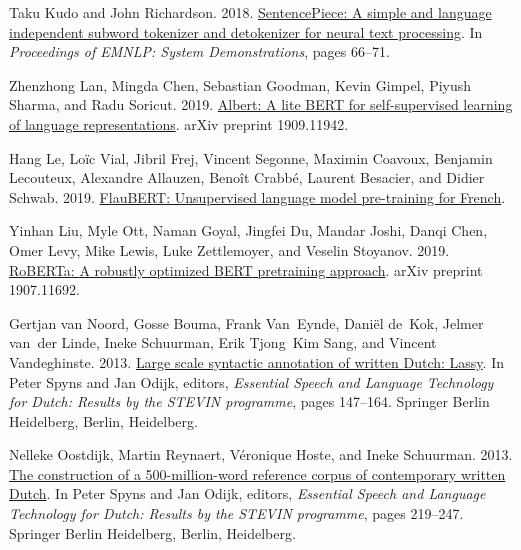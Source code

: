 \documentclass[11pt]{article}
\begin{document}
\begin{thebibliography}{21}
Taku Kudo and John Richardson. 2018.
\newblock \href {https://doi.org/10.18653/v1/D18-2012} {{S}entence{P}iece: A
  simple and language independent subword tokenizer and detokenizer for neural
  text processing}.
\newblock In \emph{Proceedings of EMNLP: System Demonstrations}, pages 66--71.

Zhenzhong Lan, Mingda Chen, Sebastian Goodman, Kevin Gimpel, Piyush Sharma, and
  Radu Soricut. 2019.
\newblock \href {https://arxiv.org/abs/1909.11942} {Albert: A lite {BERT} for
  self-supervised learning of language representations}.
\newblock arXiv preprint 1909.11942.

Hang Le, Loïc Vial, Jibril Frej, Vincent Segonne, Maximin Coavoux, Benjamin
  Lecouteux, Alexandre Allauzen, Benoît Crabbé, Laurent Besacier, and Didier
  Schwab. 2019.
\newblock \href {http://arxiv.org/abs/1912.05372} {{FlauBERT}: Unsupervised
  language model pre-training for {French}}.

Yinhan Liu, Myle Ott, Naman Goyal, Jingfei Du, Mandar Joshi, Danqi Chen, Omer
  Levy, Mike Lewis, Luke Zettlemoyer, and Veselin Stoyanov. 2019.
\newblock \href {http://arxiv.org/abs/1907.11692} {{RoBERTa}: {A} robustly
  optimized {BERT} pretraining approach}.
\newblock arXiv preprint 1907.11692.

Gertjan van Noord, Gosse Bouma, Frank Van~Eynde, Dani{\"e}l de~Kok, Jelmer
  van~der Linde, Ineke Schuurman, Erik Tjong~Kim Sang, and Vincent
  Vandeghinste. 2013.
\newblock \href {https://doi.org/10.1007/978-3-642-30910-6_9} {Large scale
  syntactic annotation of written {Dutch}: Lassy}.
\newblock In Peter Spyns and Jan Odijk, editors, \emph{Essential Speech and
  Language Technology for Dutch: Results by the STEVIN programme}, pages
  147--164. Springer Berlin Heidelberg, Berlin, Heidelberg.

Nelleke Oostdijk, Martin Reynaert, V{\'e}ronique Hoste, and Ineke Schuurman.
  2013.
\newblock \href {https://doi.org/10.1007/978-3-642-30910-6_13} {The
  construction of a 500-million-word reference corpus of contemporary written
  {Dutch}}.
\newblock In Peter Spyns and Jan Odijk, editors, \emph{Essential Speech and
  Language Technology for Dutch: Results by the STEVIN programme}, pages
  219--247. Springer Berlin Heidelberg, Berlin, Heidelberg.


\end{thebibliography}
\end{document}
